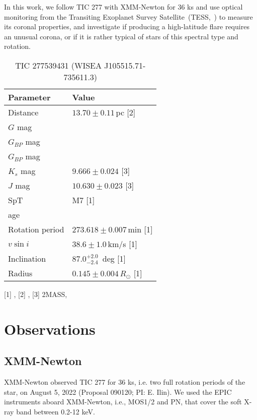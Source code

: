 \documentclass[twocolumn]{aastex631}
\begin{document}
In this work, we follow TIC 277 with XMM-Newton for 36 ks and use optical monitoring from the Transiting Exoplanet Survey Satellite~(TESS,~\citealt{ricker2015transiting}) to measure its coronal properties, and investigate if producing a high-latitude flare requires an unusual corona, or if it is rather typical of stars of this spectral type and rotation.


\begin{table}

    \caption{TIC 277539431 (WISEA J105515.71-735611.3)}
    \begin{tabular}{ll}\hline 
         Parameter & Value  \\\hline
         Distance & $13.70\pm0.11\,$pc [2] \\
         $G$ mag & \\
         $G_{BP}$ mag & \\
         $G_{BP}$ mag & \\
         $K_s$ mag & $9.666 \pm 0.024$ [3]\\
         $J$ mag & $10.630 \pm 0.023$ [3] \\
         SpT & M7 [1]\\
         age & \\
         Rotation period & $273.618 \pm 0.007\,$min [1]\\
         $v\sin i$ & $38.6\pm1.0\,$km/s [1] \\
         Inclination & $87.0^{+2.0}_{-2.4}\,$ deg [1]\\
         Radius & $0.145\pm0.004\,R_\odot$ [1]\\\hline
        
    \end{tabular}
    \newline\footnotesize
    [1] \citet{ilin2021giant}, [2] \citet{bailer-jones2018estimating}, [3] 2MASS, \citet{skrutskie2006two}
    \label{tab:modelparams}
\end{table}


\section{Observations}

\subsection{XMM-Newton}
XMM-Newton observed TIC 277 for 36 ks, i.e. two full rotation periods of the star, on August 5, 2022 (Proposal 090120; PI: E. Ilin). We used the EPIC instruments aboard XMM-Newton, i.e., MOS1/2 and PN, that cover the soft X-ray band between 0.2-12 keV. 
\end{document}
